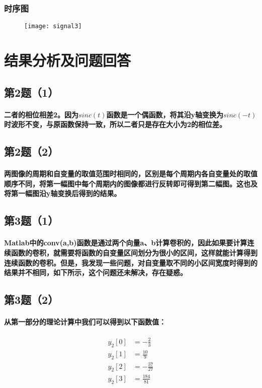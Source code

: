 \documentclass[UTF8]{ctexart}
\begin{document}
\subsubsection{时序图}
\begin{figure}[h]
\centering
\texttt{[image: signal3]}
\end{figure}


\newpage
\section{结果分析及问题回答}
\subsection{第2题（1）}
\paragraph{
二者的相位相差2。因为$sinc(t)$函数是一个偶函数，将其沿y轴变换为$sinc(-t)$时波形不变，与原函数保持一致，所以二者只是存在大小为2的相位差。
}
\subsection{第2题（2）}
\paragraph{
两图像的周期和自变量的取值范围时相同的，区别是每个周期内各自变量处的取值顺序不同，将第一幅图中每个周期内的图像都进行反转即可得到第二幅图。这也及将第一幅图沿y轴变换后得到的结果。
}
\subsection{第3题（1）}
\paragraph{
Matlab中的conv(a,b)函数是通过两个向量a、b计算卷积的，因此如果要计算连续函数的卷积，就需要将函数的自变量区间划分为很小的区间，这样就能计算得到连续函数的卷积。但是，我发现一些问题，对自变量取不同的小区间宽度时得到的结果并不相同，如下所示，这个问题还未解决，存在疑惑。
}
\subsection{第3题（2）}
\paragraph{
从第一部分的理论计算中我们可以得到以下函数值：
}
\begin{align}
y_2[0]&=-\frac{2}{3} \\
y_2[1]&=\frac{10}{9} \\
y_2[2]&=-\frac{37}{27} \\
y_2[3]&=\frac{184}{81}
\end{align}
\end{document}
